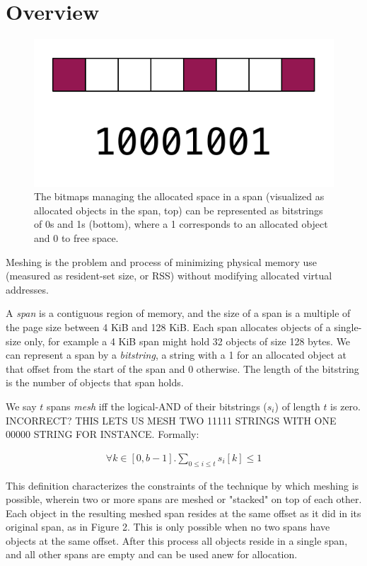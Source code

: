 \section{Overview}
\label{sec:meshing}

\begin{figure}[!t]
\centering
\includegraphics[width=.3\textwidth]{figures/bitmap_bitstring}
\caption{The bitmaps managing the allocated space in a span
  (visualized as allocated objects in the span, top) can be
  represented as bitstrings of 0s and 1s (bottom), where a 1
  corresponds to an allocated object and 0 to free space.}
\label{fig:bitmap-bitstring}
\end{figure}

Meshing is the problem and process of minimizing physical memory use
(measured as resident-set size, or RSS) without modifying allocated
virtual addresses.

A \textit{span} is a contiguous region of memory, and the size of a
span is a multiple of the page size between 4 KiB and 128 KiB.  Each
span allocates objects of a single-size only, for example a 4 KiB span
might hold 32 objects of size 128 bytes.  We can represent a span by a
\textit{bitstring}, a string with a 1 for an allocated object at that
offset from the start of the span and 0 otherwise.  The length of the
bitstring is the number of objects that span holds.

We say $t$ spans \textit{mesh} iff the logical-AND of their bitstrings
($s_i$) of length $t$ is zero. INCORRECT? THIS LETS US MESH TWO 11111 STRINGS WITH ONE 00000 STRING FOR INSTANCE. Formally:

\begin{align}
  \forall k \in [0, b-1]. \sum_{0 \leq i \leq t} s_i[k] \leq 1
\end{align}

This definition characterizes the constraints of the technique by which 
meshing is possible, wherein two or more spans are meshed or "stacked" 
on top of each other.  Each object in the resulting meshed span resides at the same 
offset as it did in its original span, as in Figure 2.  This is only possible when no two spans
have objects at the same offset.  After this process all objects reside
in a single span, and all other spans are empty and can be used anew
for allocation.

